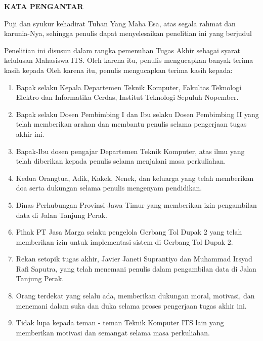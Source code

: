 \begin{center}
  \Large
  \textbf{KATA PENGANTAR}
\end{center}


\vspace{2ex}


Puji dan syukur kehadirat Tuhan Yang Maha Esa, atas segala rahmat dan karunia-Nya, sehingga penulis dapat menyelesaikan penelitian ini yang berjudul \tatitle

Penelitian ini disusun dalam rangka pemenuhan Tugas Akhir sebagai syarat kelulusan Mahasiswa ITS. Oleh karena itu, penulis mengucapkan banyak terima kasih kepada Oleh karena itu, penulis mengucapkan terima kasih kepada:

\begin{enumerate}[nolistsep]
  \item Bapak \headofdepartment selaku Kepala Departemen Teknik Komputer, Fakultas Teknologi Elektro dan Informatika Cerdas, Institut Teknologi Sepuluh Nopember.
  \item Bapak \advisor selaku Dosen Pembimbing I dan Ibu \coadvisor selaku Dosen Pembimbing II yang telah memberikan arahan dan membantu penulis selama pengerjaan tugas akhir ini.
  \item Bapak-Ibu dosen pengajar Departemen Teknik Komputer, atas ilmu yang telah diberikan kepada penulis selama menjalani masa perkuliahan.
  \item Kedua Orangtua, Adik, Kakek, Nenek, dan keluarga yang telah memberikan doa serta dukungan selama penulis mengenyam pendidikan.
  \item Dinas Perhubungan Provinsi Jawa Timur yang memberikan izin pengambilan data di Jalan Tanjung Perak.
  \item Pihak PT Jasa Marga selaku pengelola Gerbang Tol Dupak 2 yang telah memberikan izin untuk implementasi sistem di Gerbang Tol Dupak 2.
  \item Rekan setopik tugas akhir, Javier Janeti Suprantiyo dan Muhammad Irsyad Rafi Saputra, yang telah menemani penulis dalam pengambilan data di Jalan Tanjung Perak.
  \item Orang terdekat yang selalu ada, memberikan dukungan moral, motivasi, dan menemani dalam suka dan duka selama proses pengerjaan tugas akhir ini.
  \item Tidak lupa kepada teman - teman Teknik Komputer ITS lain yang memberikan motivasi dan semangat selama masa perkuliahan.
\end{enumerate}


